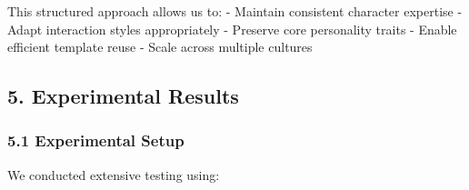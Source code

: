 \documentclass[
]{article}
\begin{document}
This structured approach allows us to: - Maintain consistent character
expertise - Adapt interaction styles appropriately - Preserve core
personality traits - Enable efficient template reuse - Scale across
multiple cultures

\subsection{5. Experimental Results}\label{experimental-results}

\subsubsection{5.1 Experimental Setup}\label{experimental-setup}

We conducted extensive testing using:
\end{document}
